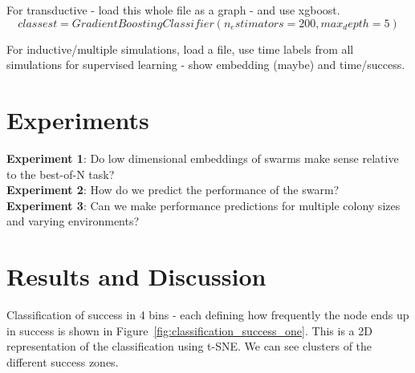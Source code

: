 \documentclass[openacc]{rsproca_new}%
\begin{document}




For transductive - load this whole file as a graph - and use xgboost. $$class est = GradientBoostingClassifier(n_estimators=200, max_depth=5)$$

For inductive/multiple simulations, load a file, use time labels from all simulations for supervised learning - show embedding (maybe) and time/success.


\section{Experiments}

\textbf{Experiment 1}: Do low dimensional embeddings of swarms make sense relative to the best-of-N task?\\ \textbf{Experiment 2}: How do we predict the performance of the swarm?\\ \textbf{Experiment 3}: Can we make performance predictions for multiple colony sizes and varying environments?





\section{Results and Discussion}



Classification of success in 4 bins - each defining how frequently the node ends up in success is shown in Figure~\ref{fig:classification_success_one}. This is a 2D representation of the classification using t-SNE. We can see clusters of the different success zones. 

\end{document}
